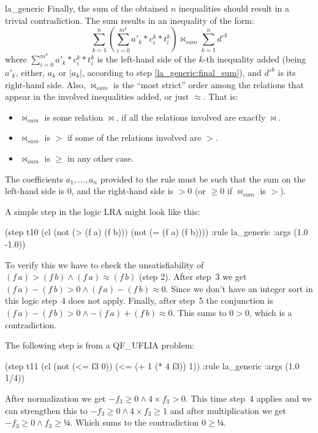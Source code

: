 \begin{RuleDescription}{la_generic}
Finally, the sum of the obtained $n$ inequalities should result in a trivial 
contradiction. The sum results in an inequality of the form:
\[
    \sum_{k=1}^{n}(\sum_{i=0}^{m^k}a'_k*c_i^k*t_i^k) \bowtie_{sum} \sum_{k=1}^{n}d'^k
\]
where $\sum_{i=0}^{m^k}a'_k*c_i^k*t_i^k$ is the left-hand side of the $k$-th inequality
added (being ${a'_k}$, either, $a_k$ or $|a_k|$, according to step 
\ref{la_generic:final_sum}), and $d'^k$ is its right-hand side. Also,
$\bowtie_{sum}$ is the ``most strict'' order among the relations that appear in the
involved inequalities added, or just $≈$. That is:
\begin{itemize}
\item $\bowtie_{sum}$ is some relation $\bowtie$, if all the relations involved are 
exactly $\bowtie$.
\item $\bowtie_{sum}$ is $>$ if some of the relations involved are $>$.
\item $\bowtie_{sum}$ is $\geq$ in any other case.
\end{itemize}

The coefficients $a_1, \dots, a_n$ provided to the rule must be such that the sum 
on the left-hand side is $0$, and the right-hand side is $>0$ (or $\geq 0$ if 
$\bowtie_{sum}$ is $>$).
\end{RuleDescription}

\begin{RuleExample}
A simple  step in the logic \textsf{LRA} might look like this:

\begin{AletheVerb}
(step t10 (cl (not (> (f a) (f b))) (not (= (f a) (f b))))
    :rule la_generic :args (1.0 -1.0))
\end{AletheVerb}

To verify this we have to check the unsatisfiability of $(f\,a) > (f\,b) \land
(f\,a) ≈ (f\,b)$ (step 2). After step~3 we get $(f\,a) - (f\,b) > 0 \land
(f\,a) - (f\,b) ≈ 0$. Since we don't have an integer sort in this logic step~4 does
not apply. Finally, after step~5 the conjunction is $(f\,a) - (f\,b) > 0 \land
- (f\,a) + (f\,b) ≈ 0$. This sums to $0 > 0$, which is a contradiction.
\end{RuleExample}

\begin{RuleExample}
The following  step is from a \textsf{QF\_UFLIA} problem:
\begin{AletheVerb}
(step t11 (cl (not (<= f3 0)) (<= (+ 1 (* 4 f3)) 1))
    :rule la_generic :args (1.0 1/4))
\end{AletheVerb}
After normalization we get $-f_3 \geq 0 \land 4\times f_3 > 0$.
This time step~4 applies and we can strengthen this to
$-f_3 \geq 0 \land 4\times f_3 \geq 1$ and after multiplication we get
$-f_3 \geq 0 \land f_3 \geq ¼$. Which sums to the contradiction
$0 \geq ¼$.
\end{RuleExample}

